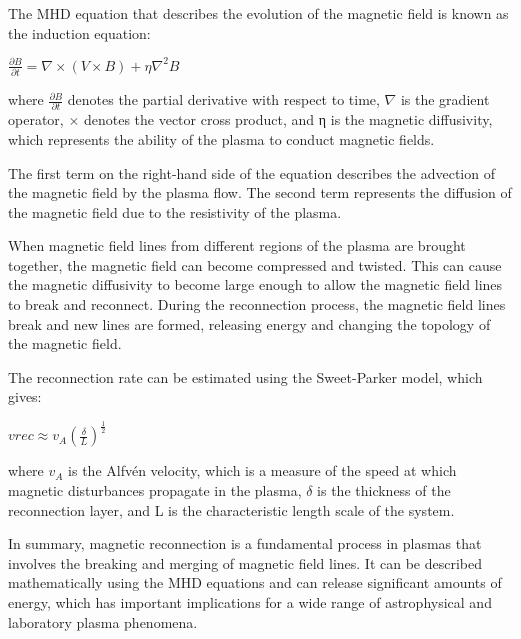 \documentclass[12pt, a4paper, oneside]{article}
\begin{document}
\begin{spacing}{2.0}
The MHD equation that describes the evolution of the magnetic field is known as the induction equation:
\begin{center}
    $\displaystyle\frac{\partial B}{\partial t} = \nabla\times (V\times B) + \eta \nabla^2 B$
\end{center}

where $\displaystyle\frac{\partial B}{\partial t}$ denotes the partial derivative with respect to time, $\nabla$ is the gradient operator, 
$\times$ denotes the vector cross product, and η is the magnetic diffusivity, 
which represents the ability of the plasma to conduct magnetic fields.

The first term on the right-hand side of the equation describes the advection of the magnetic field by the plasma flow. 
The second term represents the diffusion of the magnetic field due to the resistivity of the plasma.

When magnetic field lines from different regions of the plasma are brought together, 
the magnetic field can become compressed and twisted. This can cause the magnetic diffusivity to become large enough to allow 
the magnetic field lines to break and reconnect. During the reconnection process, the magnetic field lines break and new lines 
are formed, releasing energy and changing the topology of the magnetic field.

The reconnection rate can be estimated using the Sweet-Parker model, which gives:
\begin{center}
    $\displaystyle vrec \approx v_A(\frac{\delta}{L})^{\frac{1}{2}}$
\end{center}

where $v_A$ is the Alfvén velocity, which is a measure of the speed at which magnetic disturbances propagate in the plasma, 
$\delta$ is the thickness of the reconnection layer, and L is the characteristic length scale of the system.

In summary, magnetic reconnection is a fundamental process in plasmas that involves the breaking and merging of magnetic field lines. 
It can be described mathematically using the MHD equations and can release significant amounts of energy, 
which has important implications for a wide range of astrophysical and laboratory plasma phenomena.



\end{spacing}
\end{document}
